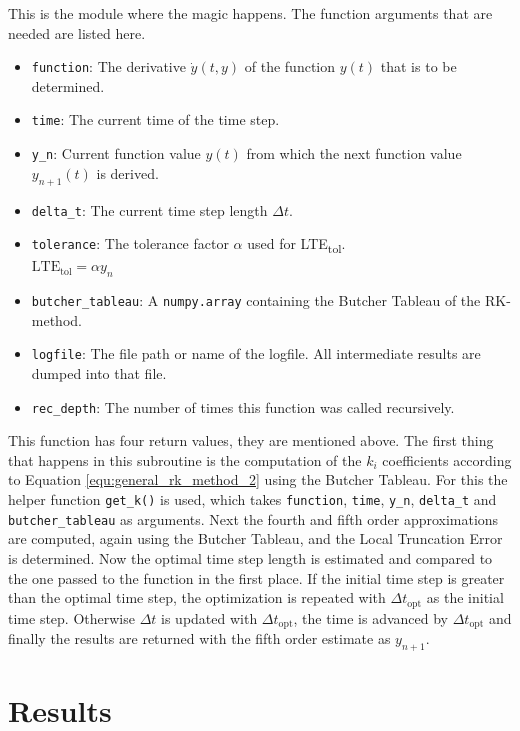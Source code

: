 \documentclass{aa}
\begin{document}
This is the module where the magic happens. The function arguments that are needed are listed
here.
\begin{itemize}
    \item \verb+function+: The derivative \(\dot{y}(t, y)\) of the function \(y(t)\) that is to
        be determined.
    \item \verb+time+: The current time of the time step.
    \item \verb+y_n+: Current function value \(y(t)\) from which the next function value
        \(y_{n+1}(t)\) is derived.
    \item \verb+delta_t+: The current time step length \(\Delta t\).
    \item \verb+tolerance+: The tolerance factor \(\alpha\) used for LTE\textsubscript{tol}.\\
        \(\mathrm{LTE}_\mathrm{tol} = \alpha y_n\)
    \item \verb+butcher_tableau+: A \verb+numpy.array+ containing the Butcher Tableau of the
        RK-method.
    \item \verb+logfile+: The file path or name of the logfile. All intermediate results are
        dumped into that file.
    \item \verb+rec_depth+: The number of times this function was called recursively.
\end{itemize}
This function has four return values, they are mentioned above. The first thing that happens in
this subroutine is the computation of the \(k_i\) coefficients according to Equation
\ref{equ:general_rk_method_2} using the Butcher Tableau. For this the helper function
\verb+get_k()+ is used, which takes \verb+function+, \verb+time+, \verb+y_n+, \verb+delta_t+
and \verb+butcher_tableau+ as arguments. Next the fourth and fifth order approximations are
computed, again using the Butcher Tableau, and the Local Truncation Error is determined. Now
the optimal time step length is estimated and compared to the one passed to the function in the
first place. If the initial time step is greater than the optimal time step, the optimization
is repeated with \(\Delta t_\mathrm{opt}\) as the initial time step. Otherwise \(\Delta t\) is
updated with \(\Delta t_\mathrm{opt}\), the time is advanced by \(\Delta t_\mathrm{opt}\) and
finally the results are returned with the fifth order estimate as \(y_{n+1}\).

\section{Results}%
\label{sec:results}
\end{document}

